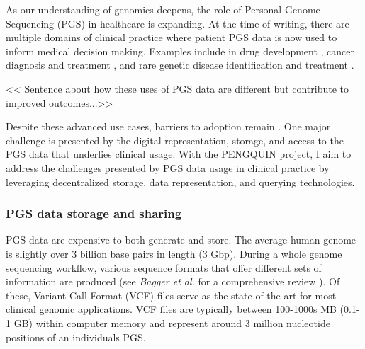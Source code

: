 \documentclass[runningheads]{llncs}
\begin{document}
As our understanding of genomics deepens, the role of Personal Genome Sequencing (PGS) in healthcare is expanding. 
At the time of writing, there are multiple domains of clinical practice where patient PGS data is now used to inform medical decision making. 
Examples include in drug development \cite{ko_new_2022}, cancer diagnosis and treatment \cite{mcleod_cancer_2013}, and rare genetic disease identification and treatment \cite{souche_recommendations_2022}.

<< Sentence about how these uses of PGS data are different but contribute to improved outcomes...>>

Despite these advanced use cases, barriers to adoption remain \cite{stefanicka-wojtas_barriers_2023}. 
One major challenge is presented by the digital representation, storage, and access to the PGS data that underlies clinical usage.
With the PENGQUIN project, I aim to address the challenges presented by PGS data usage in clinical practice by leveraging  decentralized storage, data representation, and querying technologies.  


\subsubsection{PGS data storage and sharing} 
PGS data are expensive to both generate and store. 
The average human genome is slightly over 3 billion base pairs in length (3 Gbp). 
During a whole genome sequencing workflow, various sequence formats that offer different sets of information are produced (see \textit{Bagger et al.} for a comprehensive review \cite{bagger_whole_2024}).
Of these, Variant Call Format (VCF) files \cite{danecek_variant_2011} serve as the state-of-the-art for most clinical genomic applications.
VCF files are typically between 100-1000s MB (0.1-1 GB) within computer memory and represent around 3 million nucleotide positions of an individual\textquotesingle s PGS. 

\end{document}
